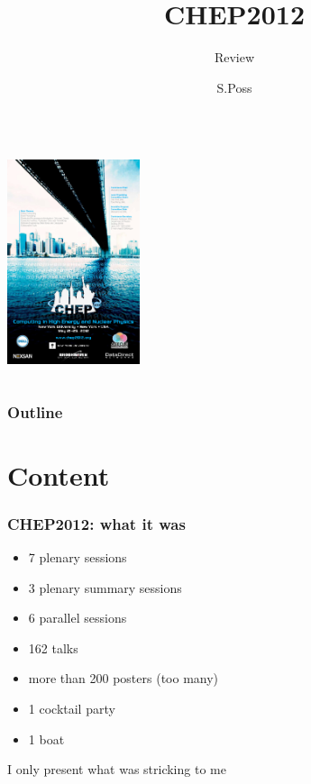 \documentclass[handout]{beamer}
\author{S.Poss}
\title{CHEP2012}
\subtitle{Review}
\begin{document}
\begin{frame}
\begin{columns}[c]
\column{6cm}
\titlepage
\column{6cm}
\begin{center}
\includegraphics[height=6cm]{CHEP2012_poster.pdf}
\end{center}
\end{columns}
\end{frame}
\begin{frame}
\frametitle{Outline}
\tableofcontents
\end{frame}

\section{Content}
\begin{frame}
\frametitle{CHEP2012: what it was}
\begin{itemize}
  \item 7 plenary sessions
  \item 3 plenary summary sessions
  \item 6 parallel sessions
  \item 162 talks
  \item more than 200 posters (too many)
  \item 1 cocktail party
  \item 1 boat
\end{itemize}
I only present what was stricking to me
\end{frame}
\end{document}
